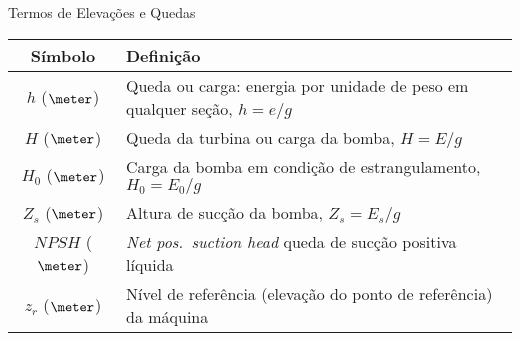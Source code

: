     \begin{frame}{Termos de Elevações e Quedas}\vspace*{-1em}
        \setlength{\tabcolsep}{2mm}
        \noindent\begin{longtable}{cp{110mm}}
            \alert{Símbolo} & \alert{Definição} \\
            \hline
            $h$ ($\meter$) &
            Queda ou carga: energia por unidade de peso em qualquer seção, \alert{$h = e/g$} \\
            $H$ ($\meter$) &
            Queda da turbina ou carga da bomba, \alert{$H = E/g$} \\
            $H_0$ ($\meter$) &
            Carga da bomba em condição de estrangulamento, \alert{$H_0 = E_0/g$} \\
            $Z_s$ ($\meter$) &
            Altura de sucção da bomba, \alert{$Z_s = E_s/g$} \\
            $NPSH$ ($\meter$) &
            \textit{Net pos.~suction head\/} queda de sucção positiva líquida \\
            $z_r$ ($\meter$) &
            Nível de referência (elevação do ponto de referência) da máquina \\
            \hline
        \end{longtable}
    \end{frame}

